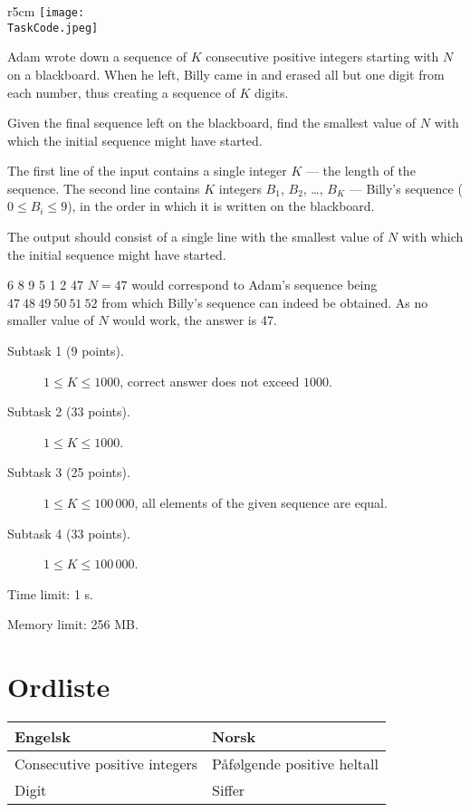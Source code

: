 \documentclass{boi2014-no}
\renewcommand{\TaskCode}{sequence}
\begin{document}
    \begin{wrapfigure}[5]{r}{5cm}
        \vspace{-24pt}
		\texttt{[image: \\TaskCode.jpeg]}
	\end{wrapfigure}

    Adam wrote down a sequence of $K$ consecutive positive integers starting
    with $N$ on a blackboard. When he left, Billy came in and erased all but one
    digit from each number, thus creating a sequence of $K$ digits.

    \Task

    Given the final sequence left on the blackboard, find the smallest
    value of $N$ with which the initial sequence might have started.

    \Input

    The first line of the input contains a single integer $K$ --- the length of
    the sequence. The second line contains $K$ integers $B_1$, $B_2$, \dots,
    $B_K$ --- Billy's sequence ($0 \le B_i \le 9$), in the order in which it is written on the
    blackboard.

    \Output

    The output should consist of a single line with the smallest value of
    $N$ with which the initial sequence might have started.

    \Example

    \example
    {
        6 8 9 5 1 2
    }
    {
        47
    }
    {
        $N = 47$ would correspond to Adam's sequence
        being $47\ 48\ 49\ 50\ 51\ 52$ from which Billy's sequence
        can indeed be obtained. As no smaller value of $N$
        would work, the answer is 47.
    }

\Scoring

\begin{description}
    \item[Subtask 1 (9 points).] $1 \le K \le 1000$, correct
        answer does not exceed $1000$.
    \item[Subtask 2 (33 points).] $1 \le K \le 1000$.
    \item[Subtask 3 (25 points).] $1 \le K \le 100\,000$, all
		elements of the given sequence are equal.
    \item[Subtask 4 (33 points).] $1 \le K \le 100\,000$.
\end{description}

\Constraints

Time limit: 1 s.

Memory limit: 256 MB.

    \FloatBarrier\section*{Ordliste}
    
    \begin{tabular}{|l|l|}
        \hline
            {\bf Engelsk} & {\bf Norsk} \\
        \hline
			Consecutive positive integers &
			Påfølgende positive heltall \\
        \hline
			Digit &
			Siffer \\
        \hline
    \end{tabular}
    
\end{document}
